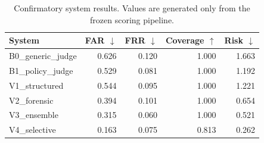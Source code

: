 \begin{table}[t]
\centering
\caption{Confirmatory system results. Values are generated only from the frozen scoring pipeline.}
\label{tab:main-results}
\begin{tabular}{lrrrr}
\toprule
System & FAR $\downarrow$ & FRR $\downarrow$ & Coverage $\uparrow$ & Risk $\downarrow$ \\
\midrule
B0\_generic\_judge & 0.626 & 0.120 & 1.000 & 1.663 \\
B1\_policy\_judge & 0.529 & 0.081 & 1.000 & 1.192 \\
V1\_structured & 0.544 & 0.095 & 1.000 & 1.221 \\
V2\_forensic & 0.394 & 0.101 & 1.000 & 0.654 \\
V3\_ensemble & 0.315 & 0.060 & 1.000 & 0.521 \\
V4\_selective & 0.163 & 0.075 & 0.813 & 0.262 \\
\bottomrule
\end{tabular}
\end{table}
